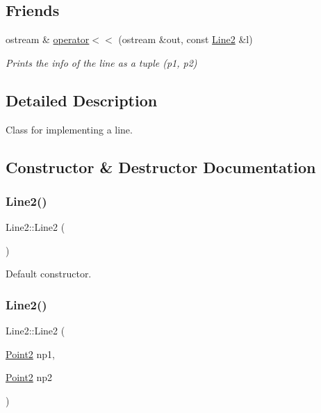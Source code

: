 \subsection*{Friends}
\begin{DoxyCompactItemize}
\item 
ostream \& \mbox{\hyperlink{class_line2_a2e9995cceed69d45eebc94c64526dd0b}{operator$<$$<$}} (ostream \&out, const \mbox{\hyperlink{class_line2}{Line2}} \&l)
\begin{DoxyCompactList}\small\item\em Prints the info of the line as a tuple (p1, p2) \end{DoxyCompactList}\end{DoxyCompactItemize}


\subsection{Detailed Description}
Class for implementing a line. 

\subsection{Constructor \& Destructor Documentation}
\mbox{\label{class_line2_a064601d6fbf1cd8002e24cade29b07d6}} 
\subsubsection{\texorpdfstring{Line2()}{Line2()}\hspace{0.1cm}{\footnotesize\ttfamily [1/2]}}
{\footnotesize\ttfamily Line2\+::\+Line2 (\begin{DoxyParamCaption}{ }\end{DoxyParamCaption})}



Default constructor. 

\mbox{\label{class_line2_afa9636d43e54ba41fb108207a83aad1a}} 
\subsubsection{\texorpdfstring{Line2()}{Line2()}\hspace{0.1cm}{\footnotesize\ttfamily [2/2]}}
{\footnotesize\ttfamily Line2\+::\+Line2 (\begin{DoxyParamCaption}\item[{\mbox{\hyperlink{class_point2}{Point2}}}]{np1,  }\item[{\mbox{\hyperlink{class_point2}{Point2}}}]{np2 }\end{DoxyParamCaption})}



